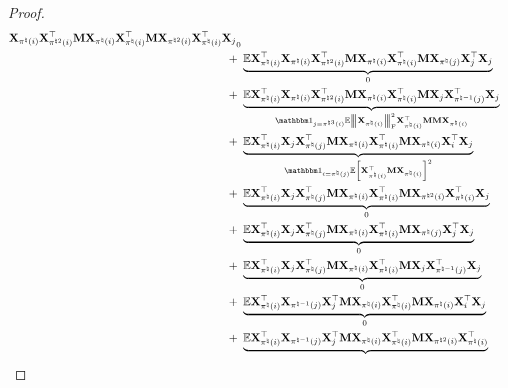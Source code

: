 \documentclass[11pt]{article}
\begin{document}
\begin{proof}
\begin{align}
{\bX_{\pi^{\natural}(i)}\bX_{\pi^{\natural 2}(i)}^{\rmt}
\bM \bX_{\pi^{\natural}(i)} \bX_{\pi^{\natural}(i)}^{\rmt} \bM
\bX_{\pi^{\natural 2}(i)}\bX_{\pi^{\natural}(i)}^{\rmt}
\bX_j}_{0} \notag \\
+~&
\underbrace{\Expc \bX_{\pi^{\natural}(i)}^{\rmt}
\bX_{\pi^{\natural}(i)}\bX_{\pi^{\natural 2}(i)}^{\rmt}
\bM \bX_{\pi^{\natural}(i)} \bX_{\pi^{\natural}(i)}^{\rmt} \bM
\bX_{\pi^{\natural}(j)}\bX_{j}^{\rmt}
\bX_j}_{0} \notag \\ +
~&
\underbrace{\Expc \bX_{\pi^{\natural}(i)}^{\rmt}
\bX_{\pi^{\natural}(i)}\bX_{\pi^{\natural 2}(i)}^{\rmt}
\bM \bX_{\pi^{\natural}(i)} \bX_{\pi^{\natural}(i)}^{\rmt} \bM
\bX_{j}\bX_{\pi^{\natural -1}(j)}^{\rmt}
\bX_j}_{
\Ind_{j = \pi^{\natural 3}(i)} \Expc \Fnorm{\bX_{\pi^{\natural}(i)}}^2 \bX_{\pi^{\natural}(i)}^{\rmt} \bM \bM \bX_{\pi^{\natural}(i)}
} \notag \\
+~&
\underbrace{
\Expc \bX_{\pi^{\natural}(i)}^{\rmt}%
\bX_{j}\bX_{\pi^{\natural}(j)}^{\rmt}
\bM \bX_{\pi^{\natural}(i)} \bX_{\pi^{\natural}(i)}^{\rmt} \bM
\bX_{\pi^{\natural}(i)}\bX_{i}^{\rmt}
\bX_j}_{
\Ind_{i = \pi^{\natural}(j)} \Expc \Bracket{\bX_{\pi^{\natural}(i)}^{\rmt}\bM \bX_{\pi^{\natural}(i)} }^2
} \notag \\
+~&
\underbrace{\Expc \bX_{\pi^{\natural}(i)}^{\rmt}
\bX_{j}\bX_{\pi^{\natural}(j)}^{\rmt}
\bM \bX_{\pi^{\natural}(i)} \bX_{\pi^{\natural}(i)}^{\rmt} \bM
\bX_{\pi^{\natural 2}(i)}\bX_{\pi^{\natural}(i)}^{\rmt}
\bX_j}_{0} \notag \\
+~&
\underbrace{\Expc \bX_{\pi^{\natural}(i)}^{\rmt}
\bX_{j}\bX_{\pi^{\natural}(j)}^{\rmt}
\bM \bX_{\pi^{\natural}(i)} \bX_{\pi^{\natural}(i)}^{\rmt} \bM
\bX_{\pi^{\natural}(j)}\bX_{j}^{\rmt}
\bX_j}_{0} \notag \\
+ ~&
\underbrace{\Expc \bX_{\pi^{\natural}(i)}^{\rmt}
\bX_{j}\bX_{\pi^{\natural}(j)}^{\rmt}
\bM \bX_{\pi^{\natural}(i)} \bX_{\pi^{\natural}(i)}^{\rmt} \bM
\bX_{j}\bX_{\pi^{\natural -1}(j)}^{\rmt}
\bX_j}_{0} \notag \\
+~&
\underbrace{\Expc \bX_{\pi^{\natural}(i)}^{\rmt}
\bX_{\pi^{\natural -1}(j)}\bX_{j}^{\rmt}
\bM \bX_{\pi^{\natural}(i)} \bX_{\pi^{\natural}(i)}^{\rmt} \bM
\bX_{\pi^{\natural}(i)}\bX_{i}^{\rmt}
\bX_j}_{0} \notag \\
+~&
\underbrace{
\Expc \bX_{\pi^{\natural}(i)}^{\rmt} %
\bX_{\pi^{\natural -1}(j)}\bX_{j}^{\rmt}
\bM \bX_{\pi^{\natural}(i)} \bX_{\pi^{\natural}(i)}^{\rmt} \bM
\bX_{\pi^{\natural 2}(i)}\bX_{\pi^{\natural}(i)}^{\rmt}
}
\end{align}
\end{proof}
\end{document}
